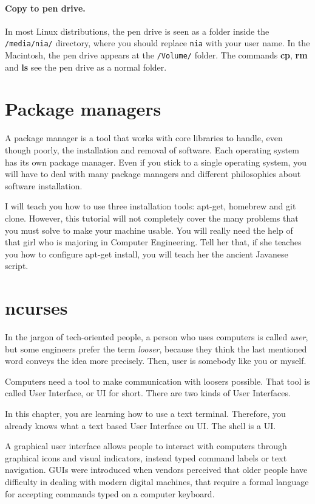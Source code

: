 \documentclass[a4paper,12pt]{book}
\begin{document}
\paragraph{Copy to pen drive.}
In most Linux distributions, the pen drive is
seen as a folder inside the \verb|/media/nia/|
directory, where you should replace \verb|nia|
with your user name. In the Macintosh, the
pen drive appears at the \verb|/Volume/| folder.
The commands {\bf cp}, {\bf rm} and {\bf ls}
see the pen drive as a normal folder.


\section{Package managers}
A package
manager is a tool that works with
core libraries to handle, even though poorly,
the installation and removal of
software. Each operating system has its own
package manager. Even if you stick to a single
operating system, you will have to
deal with many package managers
and different philosophies about
software installation.


I will teach you how to use three
installation tools: apt-get,
homebrew and git clone. However,
 this tutorial will not
 completely cover the many problems
 that you must solve 
to make your machine usable.
You will really need the help of
that girl who is majoring in
Computer Engineering.
Tell her that, if she teaches you
how to configure apt-get install,
you will teach her the ancient
Javanese script.

\section{ncurses}
In the jargon of tech-oriented people,
a person who uses computers is called
{\em user}, but some engineers
prefer the term {\em looser}, because
they think the last mentioned word conveys
the idea more precisely. Then,
user is somebody like you or myself.

Computers need a tool to make communication
with loosers possible. That tool is
called User Interface, or UI for short.
There are two kinds of User Interfaces.

In this chapter, you are learning how to use a
text terminal. Therefore, you already knows
what a text based User Interface ou UI.
The shell is a UI.

A graphical user interface
allows people to interact with
computers through graphical icons and
visual indicators, instead
typed command labels or text navigation.
GUIs were introduced when vendors
perceived that older people have
difficulty in dealing with modern
digital machines, that require a formal
language for accepting commands
typed on a computer keyboard.
\end{document}
